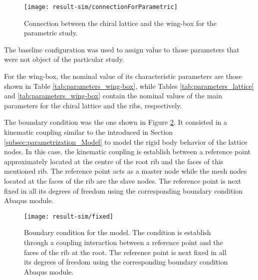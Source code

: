 \begin{figure}[!htpb]
  \centering
  \texttt{[image: result-sim/connectionForParametric]}
  \caption[Connection between the chiral lattice and the wing-box for the parametric study]{Connection between the chiral lattice and the wing-box for the parametric study.}\label{fig:connectionForParametric}
\end{figure}

The baseline configuration was used to assign value to those parameters that were not object of the particular study.

For the wing-box, the nominal value of its characteristic parameters are those shown in Table \ref{tab:parameters_wing-box}, while Tables \ref{tab:parameters_lattice} and \ref{tab:parameters_wing-box} contain the nominal values of the main parameters for the chiral lattice and the ribs, respectively.

The boundary condition was the one shown in Figure \ref{fig:fixed}. It consisted in a kinematic coupling similar to the introduced in Section \ref{subsec:parametrization_Model} to model the rigid body behavior of the lattice nodes. In this case, the kinematic coupling is establish between a reference point approximately located at the centre of the root rib and the faces of this mentioned rib. The reference point acts as a master node while the mesh nodes located at the faces of the rib are the slave nodes. The reference point is next fixed in all its degrees of freedom using the corresponding boundary condition Abaqus module.

\begin{figure}[!htpb]
  \centering
  \texttt{[image: result-sim/fixed]}
  \caption[Boundary condition for the model]{Boundary condition for the model. The condition is establish through a coupling interaction between a reference point and the faces of the rib at the root. The reference point is next fixed in all its degrees of freedom using the corresponding boundary condition Abaqus module.}\label{fig:fixed}
\end{figure}